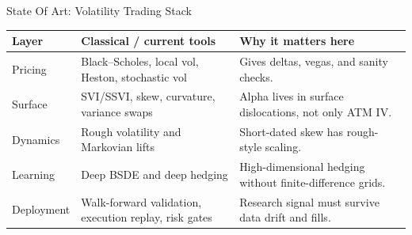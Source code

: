 \documentclass[11pt,aspectratio=169]{beamer}
\newcommand{\1}{\mathbf{1}}
\newcommand{\BS}{Black--Scholes}
\newcommand{\talkcite}[1]{{\scriptsize\color{graygreen}\cite{#1}}}
\begin{document}
\begin{frame}{State Of Art: Volatility Trading Stack}
    \small
    \begin{center}
    \renewcommand{\arraystretch}{1.18}
    \begin{tabular}{p{}p{}p{}}
    \toprule
    \textbf{Layer} & \textbf{Classical / current tools} & \textbf{Why it matters here} \\
    \midrule
    Pricing & \BS{}, local vol, Heston, stochastic vol \talkcite{blackscholes1973,heston1993,dupire1994} & Gives deltas, vegas, and sanity checks. \\
    Surface & SVI/SSVI, skew, curvature, variance swaps \talkcite{gatheral2006,bergomi2015} & Alpha lives in surface dislocations, not only ATM IV. \\
    Dynamics & Rough volatility and Markovian lifts \talkcite{gatheral2018rough} & Short-dated skew has rough-style scaling. \\
    Learning & Deep BSDE and deep hedging \talkcite{han2018deepbsde,buehler2019deephedging} & High-dimensional hedging without finite-difference grids. \\
    Deployment & Walk-forward validation, execution replay, risk gates & Research signal must survive data drift and fills. \\
    \bottomrule
    \end{tabular}
    \end{center}
\end{frame}
\end{document}
